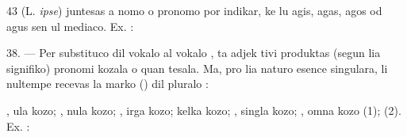 \begin{VUpage}[47]{43}
\VUblanc{3.56pt}%
 (L. \textit{ipse}) juntesas a nomo o pronomo por indikar,\nl
ke lu agis, agas, agos od agus sen ul mediaco. Ex. : \nl
{}

\VUblanc{5.71pt}%
38. --- Per substituco dil vokalo  al vokalo , ta adjek\cc
tivi produktas (segun lia signifiko) pronomi kozala o quan\cc
tesala. Ma, pro lia naturo esence singulara, li nultempe\nl
recevas la marko () dil pluralo :

\VUblancAlinea
{}, ula kozo; , nula kozo; , irga kozo; \nl
kelka kozo; , singla kozo; , omna kozo (1);\nl
{} (2). Ex. : 
\parplein
\end{VUpage}

